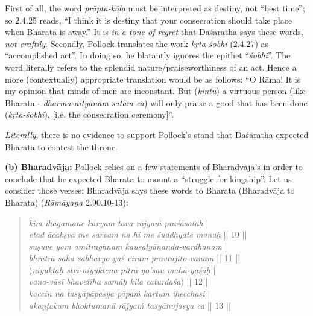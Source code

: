First of all, the word {\sl prāpta-kāla} must be interpreted as destiny, not “best time”; so 2.4.25 reads, “I think it is destiny that your consecration should take place when Bharata is away.” It is {\sl in a tone of regret} that Daśaratha says these words, {\sl not craftily}. Secondly, Pollock translates the work {\sl kṛta-śobhi} (2.4.27) as “accomplished act”. In doing so, he blatantly ignores the epithet “{\sl śobhi}”. The word literally refers to the splendid nature/praiseworthiness of an act. Hence a more (contextually) appropriate translation would be as follows: “O Rāma! It is my opinion that minds of men are inconstant. But ({\sl kintu}) a virtuous person (like Bharata - {\sl dharma-nityānām satām ca}) will only praise a good that has been done ({\sl kṛta-śobhi}), [i.e. the consecration ceremony]”.

{\sl Literally}, there is no evidence to support Pollock’s stand that Daśāratha expected Bharata to contest the throne. 

\noindent
\textbf{(b) Bharadvāja:} Pollock relies on a few statements of Bharadvāja’s in order to conclude that he expected Bharata to mount a “struggle for kingship”. Let us consider those verses: Bharadvāja says these words to Bharata (Bharadvāja to Bharata) ({\sl Rāmāyaṇa} 2.90.10-13):\\[-21pt] 
\begin{quote}
{{\sl kim ihāgamane kāryam tava rājyaṁ praśāsataḥ}} |\\
{{\sl etad ācakṣva me sarvam na hi me śuddhyate manaḥ}} || 10 ||\\
{\sl suṣuve yam amitraghnam kausalyānanda-vardhanam} |\\
{\sl bhrātrā saha sabhāryo yaś ciram pravrājito vanam} || 11 ||\\
({\sl niyuktaḥ strī-niyuktena pitrā yo’sau mahā-yaśāḥ} |\\
{\sl vana-vāsī bhavetīha samāḥ kila caturdaśa}) || 12 ||\\
{\sl kaccin na tasyāpāpasya pāpaṁ kartum ihecchasi} |\\
{\sl akaṇṭakam bhoktumanā rājyaṁ tasyānujasya ca} || 13 ||
\end{quote}

